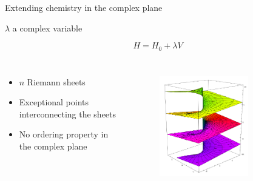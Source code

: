 \documentclass[xcolor=x11names,compress]{beamer}
\renewcommand{\(}{\begin{columns}}
\renewcommand{\)}{\end{columns}}
\newcommand{\<}[1]{\begin{column}{#1}}
\renewcommand{\>}{\end{column}}
\begin{document}
\begin{frame}{Extending chemistry in the complex plane}

\begin{beamerboxesrounded}[scheme=foncé]{\centering $\lambda$ a complex variable}

\begin{equation*}
   H = H_0 + \lambda V
\end{equation*}

\end{beamerboxesrounded}

\begin{columns}


\begin{itemize}
    \item $n$ Riemann sheets
    \vspace{0.3cm}
    \item Exceptional points interconnecting the sheets
    \vspace{0.3cm}
    \item No ordering property in the complex plane
\end{itemize}


\begin{figure}
    \centering
    \includegraphics[width=0.7\textwidth]{riemannsheet.png}
    \label{fig:my_label}
\end{figure}

\end{columns}

\end{frame}
\end{document}
